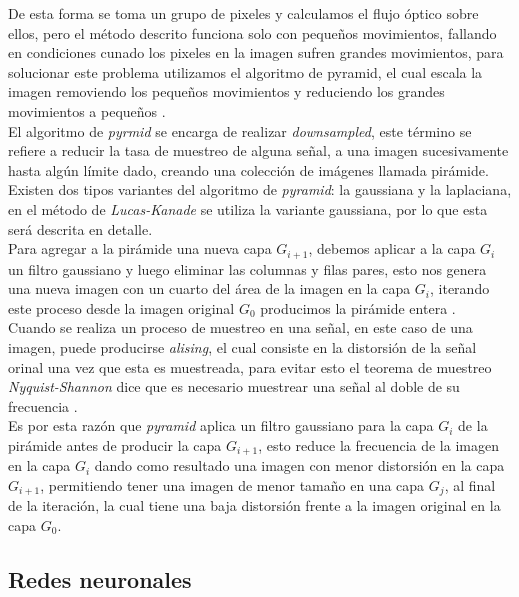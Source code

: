 \documentclass{iccmemoria}
\begin{document}
De esta forma se toma un grupo de pixeles y calculamos el flujo óptico sobre ellos, pero el método descrito funciona solo con pequeños movimientos, fallando en condiciones cunado los pixeles en la imagen sufren grandes movimientos, para solucionar este problema utilizamos el algoritmo de pyramid, el cual escala la imagen removiendo los pequeños movimientos y reduciendo los grandes movimientos a pequeños \cite{OpenCV}.\\

El algoritmo de \emph{pyrmid} se encarga de realizar \emph{downsampled}, este término se refiere a reducir la tasa de muestreo de alguna señal, a una imagen sucesivamente hasta algún límite dado, creando una colección de imágenes llamada pirámide. Existen dos tipos variantes del algoritmo de \emph{pyramid}: la gaussiana y la laplaciana, en el método de \emph{Lucas-Kanade} se utiliza la variante gaussiana, por lo que esta será descrita en detalle.\\

Para agregar a la pirámide una nueva capa $G_{i+1}$, debemos aplicar a la capa $G_i$ un filtro gaussiano y luego eliminar las columnas y filas pares, esto nos genera una nueva imagen con un cuarto del área de la imagen en la capa $G_i$, iterando este proceso desde la imagen original $G_0$ producimos la pirámide entera \cite{bradski2008learning}.\\

Cuando se realiza un proceso de muestreo en una señal, en este caso de una imagen, puede producirse \emph{alising}, el cual consiste en la distorsión de la señal orinal una vez que esta es muestreada, para evitar esto el teorema de muestreo \emph{Nyquist-Shannon} dice que es necesario muestrear una señal al doble de su frecuencia \cite{ImagePyramid}.\\

Es por esta razón que \emph{pyramid} aplica un filtro gaussiano para la capa $G_i$ de la pirámide antes de producir la capa $G_{i+1}$, esto reduce la frecuencia de la imagen en la capa $G_i$ dando como resultado una imagen con menor distorsión en la capa $G_{i+1}$, permitiendo tener una imagen de menor tamaño en una capa $G_j$, al final de la iteración, la cual tiene una baja distorsión frente a la imagen original en la capa $G_0$.\\

\subsection{Redes neuronales}
\end{document}
